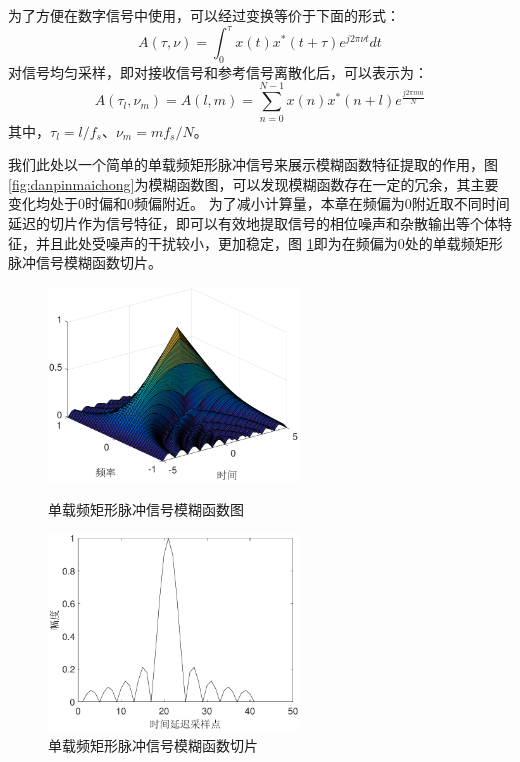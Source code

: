 为了方便在数字信号中使用，可以经过变换等价于下面的形式：
\begin{equation}
A(\tau,\nu) = \int_{0}^{\tau}x(t)x^{*}(t+\tau)e^{j2\pi\nu t}dt
\label{equ:afcon}
\end{equation}
对信号均匀采样，即对接收信号和参考信号离散化后，可以表示为：
\begin{equation}
A(\tau_l,\nu_m) = A(l, m) = \sum_{n = 0}^{N-1}x(n)x^{*}(n+l)e^{\frac{j2\pi m n}{N}}
\end{equation}
其中，$\tau_l=l/f_s$、$\nu_m=mf_s/N$。

我们此处以一个简单的单载频矩形脉冲信号来展示模糊函数特征提取的作用，图\ref{fig:danpinmaichong}为模糊函数图，可以发现模糊函数存在一定的冗余，其主要变化均处于0时偏和0频偏附近。
为了减小计算量，本章在频偏为0附近取不同时间延迟的切片作为信号特征，即可以有效地提取信号的相位噪声和杂散输出等个体特征，并且此处受噪声的干扰较小，更加稳定，图 \ref{fig:qiepian}即为在频偏为0处的单载频矩形脉冲信号模糊函数切片。

\begin{figure}[hbt]
	\centering
	\begin{minipage}[b][][b]{7cm}
		\centering
		\includegraphics[width=6.67cm]{figures/emitter/danpinmaichong}
		\caption{单载频矩形脉冲信号模糊函数图}
		\label{fig:danpinmaichong}
	\end{minipage}
	\hspace{10pt}
	\begin{minipage}[b][][b]{7cm}
		\centering
		\includegraphics[width=6.67cm]{figures/emitter/qiepian}
		\caption{单载频矩形脉冲信号模糊函数切片}
		\label{fig:qiepian}
	\end{minipage}

\end{figure}


